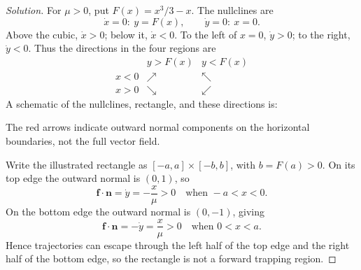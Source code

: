 \documentclass[12pt]{amsart}
\theoremstyle{plain}
\theoremstyle{definition}
\theoremstyle{definition}
\theoremstyle{plain}
\newenvironment{solution}
{\begin{proof}[Solution]}
{\end{proof}}
\begin{document}
    \begin{solution}
        For $\mu>0$, put $F(x)=x^3/3-x$. The nullclines are
        \[
            \dot x=0:\ y=F(x),\qquad
            \dot y=0:\ x=0.
        \]
        Above the cubic, $\dot x>0$; below it, $\dot x<0$.
        To the left of $x=0$, $\dot y>0$; to the right, $\dot y<0$.
        Thus the directions in the four regions are
        \[
        \begin{array}{c|cc}
             &y>F(x)&y<F(x)\\\hline
            x<0&\nearrow&\nwarrow\\
            x>0&\searrow&\swarrow
        \end{array}
        \]
        A schematic of the nullclines, rectangle, and these directions is:
        \begin{center}
        \end{center}
        The red arrows indicate outward normal components on the
        horizontal boundaries, not the full vector field.

        Write the illustrated rectangle as $[-a,a]\times[-b,b]$, with
        $b=F(a)>0$. On its top edge the outward normal is $(0,1)$, so
        \[
            \mathbf f\cdot\mathbf n=\dot y=-\frac{x}{\mu}>0
            \quad\text{when }-a<x<0.
        \]
        On the bottom edge the outward normal is $(0,-1)$, giving
        \[
            \mathbf f\cdot\mathbf n=-\dot y=\frac{x}{\mu}>0
            \quad\text{when }0<x<a.
        \]
        Hence trajectories can escape through the left half of the top
        edge and the right half of the bottom edge, so the rectangle
        is not a forward trapping region.


\end{solution}
\end{document}
